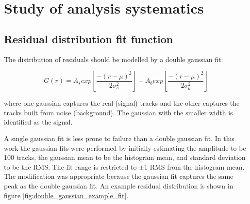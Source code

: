 

\chapter[Analysis systematics]{Study of analysis systematics}
\label{appendix:systematics}


\section{Residual distribution fit function}
\label{appendix:systematics_res_fit_fcn}

The distribution of residuals should be modelled by a double gaussian fit:

\begin{equation}
\label{eqn:doub_gaus}
G(r) = A_{s}exp\left[ \frac{-(r-\mu)^{2}}{2\sigma_s^{2}} \right] + A_{b}exp\left[ \frac{-(r-\mu)^{2}}{2\sigma_b^{2}} \right]
\end{equation}

where one gaussian captures the real (signal) tracks and the other captures the tracks built from noise (background). The gaussian with the smaller width is identified as the signal. 

A single gaussian fit is less prone to failure than a double gaussian fit. In this work the gaussian fits were performed by initially estimating the amplitude to be 100 tracks, the gaussian mean to be the histogram mean, and standard deviation to be the RMS. The fit range is restricted to $\pm$1 RMS from the histogram mean. The modification was appropriate because the gaussian fit captures the same peak as the double gaussian fit. An example residual distribution is shown in figure \ref{fig:double_gaussian_example_fit}. 

